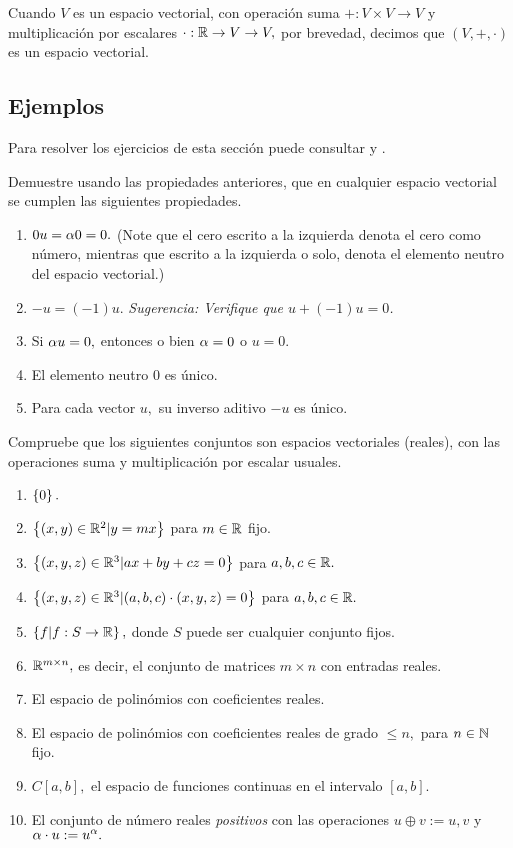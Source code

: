 \begin{rem}
 Cuando $V$ es un espacio vectorial, con operaci\'on suma $+:V \times V \to V$ y multiplicaci\'on por escalares
$\cdot:\mathbb{R} \to V \to V,$ por brevedad, decimos que $(V, +, \cdot)$ es un espacio vectorial.
\end{rem}



\subsection*{Ejemplos}

Para resolver los ejercicios de esta secci\'on puede consultar \cite[sec. 4.2]{G} y \cite[sec. 2.1]{HK}.

\begin{problema}[\dag]
Demuestre usando las propiedades anteriores, que en cualquier espacio vectorial se cumplen las siguientes propiedades.
\begin{enumerate}
 \item $0  u=\alpha  0=0.$ (Note que el cero escrito a la izquierda denota el cero como número, mientras que escrito a la izquierda o solo, denota el elemento neutro  del espacio vectorial.)
 \item $-u=(-1) u.$ \emph{Sugerencia: Verifique que $u+(-1)u=0$.}
 \item Si $\alpha u=0,$ entonces o bien $\alpha=0$ o $u=0.$
 \item El elemento neutro $0$ es único.
 \item Para cada vector $u,$ su inverso aditivo $-u$ es único.
\end{enumerate}
\end{problema}

\begin{problema}
 Compruebe que los siguientes conjuntos son espacios vectoriales (reales), con las operaciones suma y multiplicaci\'on por escalar usuales.
 \begin{enumerate}
 \item $\left\{ 0 \right\}.$
 \item $\left\{ (x,y)\in \mathbb{R}^{2}|y=mx \right\}$ para $m\in \mathbb{R}$ fijo.
 \item $\left\{ (x,y,z)\in \mathbb{R}^{3}| ax+by+cz=0 \right\}$ para $a,b,c\in \mathbb{R}.$
 \item $\left\{ (x,y,z)\in \mathbb{R}^{3}|(a,b,c)\cdot (x,y,z)=0 \right\}$ para $a,b,c\in \mathbb{R}.$
  \item $\left\{ f|f:S\to \mathbb{R} \right\},$ donde $S$ puede ser cualquier conjunto fijos.
  \item $\mathbb{R}^{m\times n},$ es decir, el conjunto de matrices $m\times n$ con entradas reales.
  \item  El espacio de polin\'omios con coeficientes reales.
  \item El espacio de polin\'omios con coeficientes reales de grado $\leq n,$ para $n \in \mathbb{N}$ fijo.
  \item $C[a,b],$ el espacio de funciones continuas en el intervalo $[a,b].$
  \item El conjunto de número reales \emph{positivos} con las operaciones $u\oplus v:= u,v$ y $\alpha \cdot u:=u^{\alpha}.$
 \end{enumerate}
\end{problema}

